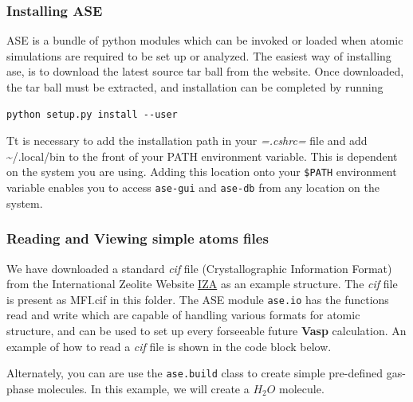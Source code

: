 \documentclass[11pt]{article}
\begin{document}
\subsubsection{Installing ASE}\label{installing-ase}

ASE is a bundle of python modules which can be invoked or loaded when
atomic simulations are required to be set up or analyzed. The easiest
way of installing ase, is to download the latest source tar ball from
the website. Once downloaded, the tar ball must be extracted, and
installation can be completed by running

\begin{verbatim}
python setup.py install --user
\end{verbatim}

Tt is necessary to add the installation path in your \emph{=.cshrc=}
file and add \textasciitilde{}/.local/bin to the front of your PATH
environment variable. This is dependent on the system you are using.
Adding this location onto your \texttt{\$PATH} environment variable
enables you to access \texttt{ase-gui} and \texttt{ase-db} from any
location on the system.

    \subsubsection{Reading and Viewing simple atoms
files}\label{reading-and-viewing-simple-atoms-files}

We have downloaded a standard \emph{cif} file (Crystallographic
Information Format) from the International Zeolite Website
\href{http://www.iza-online.org/}{IZA} as an example structure. The
\emph{cif} file is present as MFI.cif in this folder. The ASE module
\texttt{ase.io} has the functions read and write which are capable of
handling various formats for atomic structure, and can be used to set up
every forseeable future \textbf{Vasp} calculation. An example of how to
read a \emph{cif} file is shown in the code block below.

Alternately, you can are use the \texttt{ase.build} class to create
simple pre-defined gas-phase molecules. In this example, we will create
a \(H_2O\) molecule.
\end{document}
